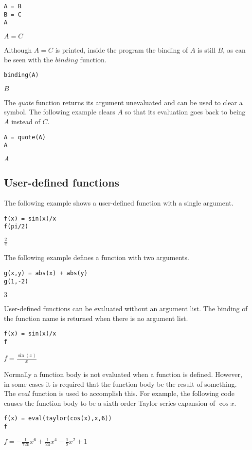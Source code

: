 \begin{Verbatim}[formatcom=\color{blue}]
A = B
B = C
A
\end{Verbatim}

$\displaystyle A=C$

Although $A=C$ is printed,
inside the program the binding of $A$ is still $B$, as can be seen with
the $binding$ function.

\begin{Verbatim}[formatcom=\color{blue}]
binding(A)
\end{Verbatim}

$\displaystyle B$

The {\it quote} function returns its argument unevaluated
and can be used to clear a symbol.
The following example clears $A$ so that its evaluation goes back to
being $A$ instead of $C$.

\begin{Verbatim}[formatcom=\color{blue}]
A = quote(A)
A
\end{Verbatim}

$\displaystyle A$

\subsection{User-defined functions}
The following example shows
a user-defined function with a single argument.

\begin{Verbatim}[formatcom=\color{blue}]
f(x) = sin(x)/x
f(pi/2)
\end{Verbatim}

$\displaystyle \frac{2}{\pi}$

The following example defines a function with two arguments.

\begin{Verbatim}[formatcom=\color{blue}]
g(x,y) = abs(x) + abs(y)
g(1,-2)
\end{Verbatim}

$\displaystyle 3$

User-defined functions can be evaluated without an argument list.
The binding of the function name is returned when there is no
argument list.

\begin{Verbatim}[formatcom=\color{blue}]
f(x) = sin(x)/x
f
\end{Verbatim}

$\displaystyle f=\frac{\sin(x)}{x}$

Normally a function body is not evaluated when a function is defined.
However, in some cases it is required that the function body be the
result of something.
The $eval$ function is used to accomplish this.
For example, the following code causes the function body to be a sixth order Taylor series expansion of $\cos x$.

\begin{Verbatim}[formatcom=\color{blue}]
f(x) = eval(taylor(cos(x),x,6))
f
\end{Verbatim}

$\displaystyle f=-\frac{1}{720}x^6+\frac{1}{24}x^4-\frac{1}{2}x^2+1$
